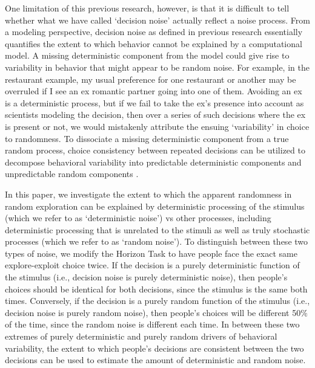 \documentclass[12pt]{article}
\begin{document}
{	One limitation of this previous research, however, is that it is difficult to tell whether what we have called `decision noise' actually reflect a noise process. From a modeling perspective, decision noise as defined in previous research essentially quantifies the extent to which behavior cannot be explained by a computational model. A missing deterministic component from the model could give rise to variability in behavior that might appear to be random noise. For example, in the restaurant example, my usual preference for one restaurant or another may be overruled if I see an ex romantic partner going into one of them. Avoiding an ex is a deterministic process, but if we fail to take the ex's presence into account as scientists modeling the decision, then over a series of such decisions where the ex is present or not, we would mistakenly attribute the ensuing `variability' in choice to randomness. To dissociate a missing deterministic component from a true random process, choice consistency between repeated decisions can be utilized to decompose behavioral variability into predictable deterministic components and unpredictable random components \citep{WYART2016, Wyart_2018, Findling19, Findling21}.
		
	In this paper, we investigate the extent to which the apparent randomness in random exploration can be explained by deterministic processing of the stimulus (which we refer to as `deterministic noise') vs other processes, including deterministic processing that is unrelated to the stimuli as well as truly stochastic processes (which we refer to as `random noise'). To distinguish between these two types of noise, we modify the Horizon Task \citep{wilson2014} to have people face the exact same explore-exploit choice twice. If the decision is a purely deterministic function of the stimulus (i.e., decision noise is purely deterministic noise), then people's choices should be identical for both decisions, since the stimulus is the same both times. Conversely, if the decision is a purely random function of the stimulus (i.e., decision noise is purely random noise), then people's choices will be different 50$\%$ of the time, since the random noise is different each time. In between these two extremes of purely deterministic and purely random drivers of behavioral variability, the extent to which people's decisions are consistent between the two decisions can be used to estimate the amount of deterministic and random noise. 
		
}
\end{document}
